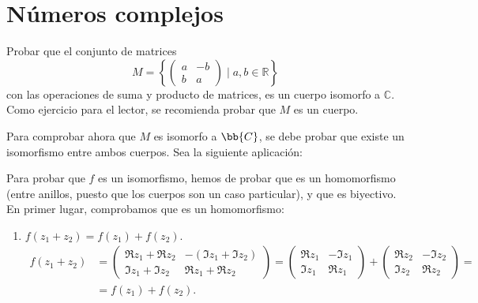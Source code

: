 \section{Números complejos}

\begin{ejercicio}
    Probar que el conjunto de matrices
    \[
        M = \left\{ \begin{pmatrix} a & -b \\ b & a \end{pmatrix} \mid a,b \in \mathbb{R} \right\}
    \]
    con las operaciones de suma y producto de matrices, es un cuerpo isomorfo a $\mathbb{C}$.\\

    Como ejercicio para el lector, se recomienda probar que $M$ es un cuerpo.

    Para comprobar ahora que $M$ es isomorfo a $\bb{C}$, se debe probar que existe un isomorfismo entre ambos cuerpos.
    Sea la siguiente aplicación:

    Para probar que $f$ es un isomorfismo, hemos de probar que es un homomorfismo (entre anillos, puesto que los cuerpos son un caso particular), y que es biyectivo. En primer lugar, comprobamos que es un homomorfismo:
    \begin{enumerate}
        \item $f(z_1+z_2)=f(z_1)+f(z_2)$.
        \begin{align*}
            f(z_1+z_2) &= \begin{pmatrix}
                \Re z_1 + \Re z_2 & -(\Im z_1 + \Im z_2) \\
                \Im z_1 + \Im z_2 & \Re z_1 + \Re z_2
            \end{pmatrix}
            = \begin{pmatrix} \Re z_1 & -\Im z_1 \\ \Im z_1 & \Re z_1 \end{pmatrix} + \begin{pmatrix} \Re z_2 & -\Im z_2 \\ \Im z_2 & \Re z_2 \end{pmatrix} =\\&= f(z_1) + f(z_2).
        \end{align*}


\end{enumerate}
\end{ejercicio}
